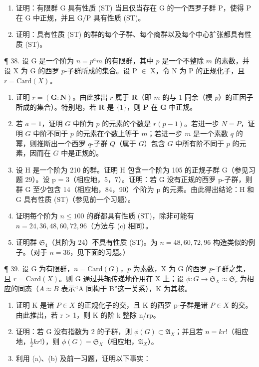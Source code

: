 \begin{enumerate}
\def\labelenumi{(\alph{enumi})}
\setcounter{enumi}{2}
\item
  证明：有限群 G 具有性质 (ST) 当且仅当存在 G 的一个西罗子群 P，使得 P 在 G 中正规，并且 G/P 具有性质 (ST)。
\item
  证明：具有性质 (ST) 的群的每个子群、每个商群以及每个中心扩张都具有性质 (ST)。
\end{enumerate}

¶ 38. 设 G 是一个阶为 \(n = p^{a}m\) 的有限群，其中 \(p\) 是一个不整除 \(m\) 的素数，并设 X 为 G 的西罗 \(p\)-子群所成的集合。设 P \ensuremath{\in} X，令 N 为 P 的正规化子，且 \(r = \text{Card}(X)\)。

\begin{enumerate}
\def\labelenumi{(\alph{enumi})}
\item
  证明 \(r = (\mathbf{G}:\mathbf{N})\)。由此推出 \(r\) 属于 \(\mathbf{R}\)（即 \(m\) 的与 1 同余（模 \(p\)）的正因子所成的集合）。特别地，若 \(\mathbf{R}\) 是 \(\{1\}\)，则 \(\mathbf{P}\) 在 \(\mathbf{G}\) 中正规。
\item
  若 \(a = 1\)，证明 \(G\) 中阶为 \(p\) 的元素的个数是 \(r(p - 1)\)。若进一步 \(N = P\)，证明 \(G\) 中阶不同于 \(p\) 的元素在个数上等于 \(m\)；若进一步 \(m\) 是一个素数 \(q\) 的幂，则推断出一个西罗 \(q\)-子群 \(Q\)（属于 \(G\)）包含 \(G\) 中所有阶不同于 \(p\) 的元素，因而在 \(G\) 中是正规的。
\item
  设 H 是一个阶为 210 的群。证明 H 包含一个阶为 105 的正规子群 G（参见习题 29）。设 p = 3（相应地，5，7）。证明：若 G 没有正规的西罗 p-子群，则群 G 至少包含 14（相应地，84，90）个阶为 p 的元素。由此得出结论：H 和 G 具有性质 (ST)（参见前一个习题）。
\item
  证明每个阶为 \(n \leqslant 100\) 的群都具有性质 (ST)，除非可能有 \(n = 24, 36, 48, 60, 72, 96\)（方法与 (c) 相同）。
\item
  证明群 \(\mathfrak{S}_4\)（其阶为 24）不具有性质 (ST)。为 \(n = 48, 60, 72, 96\) 构造类似的例子。（对于 \(n = 36\)，见下面的习题。）
\end{enumerate}

¶ 39. 设 G 为有限群，\(n = \text{Card}(G)\)，\(p\) 为素数，X 为 G 的西罗 \(p\)-子群之集，且 \(r = \text{Card}(X)\)。则 G 通过共轭传递地作用在 X 上；设 \(\phi: G \to \mathfrak{S}_{X} \approx \mathfrak{S}_r\) 为相应的同态（\(A \approx B\) 表示“A 同构于 B”这一关系），K 为其核。

\begin{enumerate}
\def\labelenumi{(\alph{enumi})}
\item
  证明 K 是诸 \(P \in X\) 的正规化子的交，且 K 的西罗 p-子群是诸 \(P \in X\) 的交。由此推出，若 r \textgreater{} 1，则 K 的阶 k 整除 n/rp。
\item
  证明：若 G 没有指数为 2 的子群，则 \(\phi(G) \subset \mathfrak{A}_{X}\)；并且若 \(n = kr!\)（相应地，\(\frac{1}{2}kr!\)），则 \(\phi(G) = \mathfrak{S}_{X}\)（相应地，\(\mathfrak{A}_{X}\)）。
\item
  利用 (a)、(b) 及前一习题，证明以下事实：
\end{enumerate}

